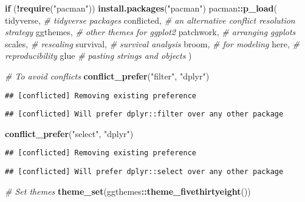 \documentclass[
]{book}
\newenvironment{Shaded}{\begin{snugshade}}{\end{snugshade}}
\newcommand{\CommentTok}[1]{\textcolor[rgb]{0.56,0.35,0.01}{\textit{#1}}}
\newcommand{\ControlFlowTok}[1]{\textcolor[rgb]{0.13,0.29,0.53}{\textbf{#1}}}
\newcommand{\KeywordTok}[1]{\textcolor[rgb]{0.13,0.29,0.53}{\textbf{#1}}}
\newcommand{\NormalTok}[1]{#1}
\newcommand{\OperatorTok}[1]{\textcolor[rgb]{0.81,0.36,0.00}{\textbf{#1}}}
\newcommand{\StringTok}[1]{\textcolor[rgb]{0.31,0.60,0.02}{#1}}
\begin{document}
\begin{Shaded}
\begin{Highlighting}[]
\ControlFlowTok{if}\NormalTok{ (}\OperatorTok{!}\KeywordTok{require}\NormalTok{(}\StringTok{"pacman"}\NormalTok{)) }\KeywordTok{install.packages}\NormalTok{(}\StringTok{"pacman"}\NormalTok{)}
\NormalTok{pacman}\OperatorTok{::}\KeywordTok{p\_load}\NormalTok{(}
\NormalTok{ tidyverse, }\CommentTok{\# tidyverse packages }
\NormalTok{ conflicted, }\CommentTok{\# an alternative conflict resolution strategy }
\NormalTok{ ggthemes, }\CommentTok{\# other themes for ggplot2 }
\NormalTok{ patchwork, }\CommentTok{\# arranging ggplots}
\NormalTok{ scales, }\CommentTok{\# rescaling }
\NormalTok{ survival, }\CommentTok{\# survival analysis}
\NormalTok{ broom, }\CommentTok{\# for modeling}
\NormalTok{ here, }\CommentTok{\# reproducibility }
\NormalTok{ glue }\CommentTok{\# pasting strings and objects }
\NormalTok{)}

\CommentTok{\# To avoid conflicts }
\KeywordTok{conflict\_prefer}\NormalTok{(}\StringTok{"filter"}\NormalTok{, }\StringTok{"dplyr"}\NormalTok{) }
\end{Highlighting}
\end{Shaded}

\begin{verbatim}
## [conflicted] Removing existing preference
\end{verbatim}

\begin{verbatim}
## [conflicted] Will prefer dplyr::filter over any other package
\end{verbatim}

\begin{Shaded}
\begin{Highlighting}[]
\KeywordTok{conflict\_prefer}\NormalTok{(}\StringTok{"select"}\NormalTok{, }\StringTok{"dplyr"}\NormalTok{) }
\end{Highlighting}
\end{Shaded}

\begin{verbatim}
## [conflicted] Removing existing preference
\end{verbatim}

\begin{verbatim}
## [conflicted] Will prefer dplyr::select over any other package
\end{verbatim}

\begin{Shaded}
\begin{Highlighting}[]
\CommentTok{\# Set themes }
\KeywordTok{theme\_set}\NormalTok{(ggthemes}\OperatorTok{::}\KeywordTok{theme\_fivethirtyeight}\NormalTok{())}
\end{Highlighting}
\end{Shaded}
\end{document}
